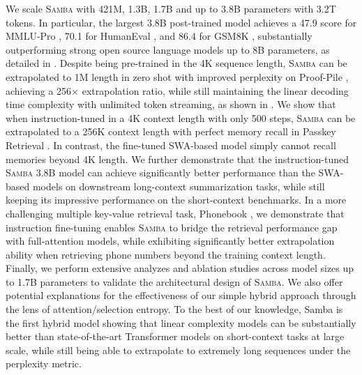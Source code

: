 \documentclass{article}
\begin{document}
We scale \textsc{Samba} with 421M, 1.3B, 1.7B and up to 3.8B parameters with 3.2T tokens. In particular, the largest 3.8B post-trained model achieves a 47.9 score for MMLU-Pro \citep{mmlu}, 70.1 for HumanEval \citep{humaneval}, and 86.4 for GSM8K \citep{gsm8k}, substantially outperforming strong open source language models up to 8B parameters, as detailed in . Despite being pre-trained in the 4K sequence length, \textsc{Samba} can be extrapolated to 1M length in zero shot with improved perplexity on Proof-Pile  \citep{proofpile}, achieving a 256$\times$ extrapolation ratio, while still maintaining the linear decoding time complexity with unlimited token streaming, as shown in .
We show that when instruction-tuned in a 4K context length with only 500 steps, \textsc{Samba} can be extrapolated to a 256K context length with perfect memory recall in Passkey Retrieval \citep{pk}. In contrast, the fine-tuned SWA-based model simply cannot recall memories beyond 4K length. We further demonstrate that the instruction-tuned \textsc{Samba} 3.8B model can achieve significantly better performance than the SWA-based models on downstream long-context summarization tasks, while still keeping its impressive performance on the short-context benchmarks. In a more challenging multiple key-value retrieval task, Phonebook \citep{jelassi2024repeat}, we demonstrate that instruction fine-tuning enables \textsc{Samba} to bridge the retrieval performance gap with full-attention models, while exhibiting significantly better extrapolation ability when retrieving phone numbers beyond the training context length.
Finally, we perform extensive analyzes and ablation studies across model sizes up to 1.7B parameters to validate the architectural design of \textsc{Samba}. We also offer potential explanations for the effectiveness of our simple hybrid approach through the lens of attention/selection entropy. To the best of our knowledge, Samba is the first hybrid model showing that linear complexity models can be substantially better than state-of-the-art Transformer models on short-context tasks at large scale, while still being able to extrapolate to extremely long sequences under the perplexity metric. 
\end{document}

